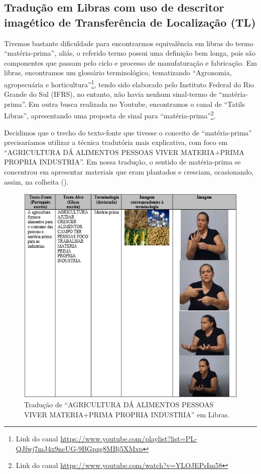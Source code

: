 \documentclass[portuguese]{textolivre}
\begin{document}
\subsection{Tradução em Libras com uso de descritor imagético de Transferência de Localização (TL)}\label{sec-organizacao-latex}
Tivemos bastante dificuldade para encontrarmos equivalência em libras do termo “matéria-prima”, aliás, o referido termo possui uma definição bem longa, pois são componentes que passam pelo ciclo e processo de manufaturação e fabricação. Em libras, encontramos um glossário terminológico, tematizando “Agronomia, agropecuária e horticultura”\footnote{Link do canal \url{https://www.youtube.com/playlist?list=PL-QJfwj7mJ4x9ncUG-9BGpzg8MBj5XMxp}}, tendo sido elaborado pelo Instituto Federal do Rio Grande do Sul (IFRS), no entanto, não havia nenhum sinal-termo de “matéria-prima”. Em outra busca realizada no Youtube, encontramos o canal de “Tatils Libras”, apresentando uma proposta de sinal para “matéria-prima”\footnote{Link do canal \url{https://www.youtube.com/watch?v=YLOJEPsIm58}}. 

Decidimos que o trecho do texto-fonte que tivesse o conceito de “matéria-prima” precisaríamos utilizar a técnica tradutória mais explicativa, com foco em “AGRICULTURA DÁ ALIMENTOS PESSOAS VIVER MATERIA+PRIMA PROPRIA INDUSTRIA”. Em nossa tradução, o sentido de matéria-prima se concentrou em apresentar materiais que eram plantados e cresciam, ocasionando, assim, na colheita ().

\begin{figure}[h!]
    \centering
    \includegraphics[width=0.75\linewidth]{Fig9.png}
    \caption{Tradução de “AGRICULTURA DÁ ALIMENTOS PESSOAS VIVER MATERIA+PRIMA PROPRIA INDUSTRIA” em Libras.}
    \label{fig9}
\end{figure}
\end{document}
